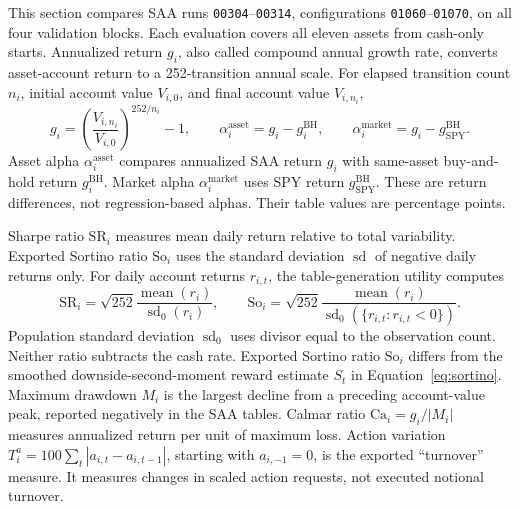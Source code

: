 This section compares SAA runs \texttt{00304}--\texttt{00314}, configurations \texttt{01060}--\texttt{01070}, on all four validation blocks. Each evaluation covers all eleven assets from cash-only starts. Annualized return \(g_i\), also called compound annual growth rate, converts asset-account return to a 252-transition annual scale. For elapsed transition count \(n_i\), initial account value \(V_{i,0}\), and final account value \(V_{i,n_i}\),
\begin{equation}
g_i=\left(\frac{V_{i,n_i}}{V_{i,0}}\right)^{252/n_i}-1,\qquad
\alpha_i^{\mathrm{asset}}=g_i-g_i^{\mathrm{BH}},\qquad
\alpha_i^{\mathrm{market}}=g_i-g_{\mathrm{SPY}}^{\mathrm{BH}}.
\label{eq:saa-evaluation-alpha}
\end{equation}
Asset alpha \(\alpha_i^{\mathrm{asset}}\) compares annualized SAA return \(g_i\) with same-asset buy-and-hold return \(g_i^{\mathrm{BH}}\). Market alpha \(\alpha_i^{\mathrm{market}}\) uses SPY return \(g_{\mathrm{SPY}}^{\mathrm{BH}}\). These are return differences, not regression-based alphas. Their table values are percentage points.

Sharpe ratio \(\mathrm{SR}_i\) measures mean daily return relative to total variability. Exported Sortino ratio \(\mathrm{So}_i\) uses the standard deviation $\operatorname{sd}$ of negative daily returns only. For daily account returns \(r_{i,t}\), the table-generation utility computes
\begin{equation}
\mathrm{SR}_i=\sqrt{252}\frac{\operatorname{mean}(r_i)}{\operatorname{sd}_0(r_i)},\qquad
\mathrm{So}_i=\sqrt{252}\frac{\operatorname{mean}(r_i)}
{\operatorname{sd}_0(\{r_{i,t}:r_{i,t}<0\})}.
\label{eq:saa-evaluation-ratios}
\end{equation}
Population standard deviation \(\operatorname{sd}_0\) uses divisor equal to the observation count. Neither ratio subtracts the cash rate. Exported Sortino ratio \(\mathrm{So}_i\) differs from the smoothed downside-second-moment reward estimate \(S_t\) in Equation~\eqref{eq:sortino}. Maximum drawdown \(M_i\) is the largest decline from a preceding account-value peak, reported negatively in the SAA tables. Calmar ratio \(\mathrm{Ca}_i=g_i/|M_i|\) measures annualized return per unit of maximum loss. Action variation \(T_i^a=100\sum_t|a_{i,t}-a_{i,t-1}|\), starting with \(a_{i,-1}=0\), is the exported ``turnover'' measure. It measures changes in scaled action requests, not executed notional turnover.

